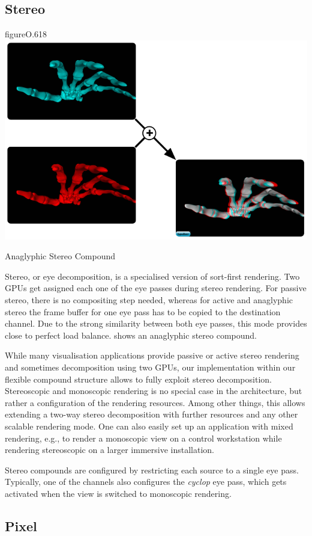 \subsection{Stereo}


\begin{wrapfloat}{figure}{O}{.618\textwidth}
 \includegraphics[width=.618\textwidth]{images/Stereo}
 {\caption{\label{fStereo}Anaglyphic Stereo Compound}}
\end{wrapfloat}

Stereo, or eye decomposition, is a specialised version of sort-first rendering.
Two GPUs get assigned each one of the eye passes during stereo rendering. For
passive stereo, there is no compositing step needed, whereas for active and
anaglyphic stereo the frame buffer for one eye pass has to be copied to the
destination channel. Due to the strong similarity between both eye passes, this
mode provides close to perfect load balance.  shows an ana\-gly\-phic stereo compound.

While many visualisation applications provide passive or active stereo rendering and
sometimes decomposition using two GPUs, our implementation within our flexible
compound structure allows to fully exploit stereo decomposition.  Stereoscopic
and monoscopic rendering is no special case in the architecture, but rather a
configuration of the rendering resources. Among other things, this allows
extending a two-way stereo decomposition with further resources and any other
scalable rendering mode. One can also easily set up an application with mixed
rendering, e.g., to render a monoscopic view on a control workstation while
rendering stereoscopic on a larger immersive installation.

Stereo compounds are configured by restricting each source to a single eye
pass. Typically, one of the channels also configures the {\em cyclop} eye
pass, which gets activated when the view is switched to monoscopic rendering.


\subsection{Pixel}

